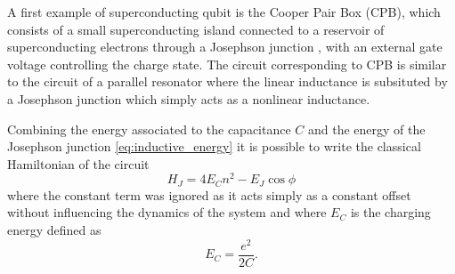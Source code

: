 A first example of superconducting qubit is the Cooper Pair Box (CPB), which consists of a small superconducting island connected to a reservoir of superconducting electrons through a Josephson junction \cite{Vion2002}, with an external gate voltage controlling the charge state.
The circuit corresponding to CPB is similar to the circuit of a parallel resonator where the linear inductance is subsituted by a Josephson junction which simply acts as a nonlinear inductance.

Combining the energy associated to the capacitance $C$ and the energy of the Josephson junction \ref{eq:inductive_energy} it is possible to write the classical Hamiltonian of the circuit
\begin{equation}\label{eq:CPB_hamiltonian}
    H_J = 4E_C n^2 - E_J\cos{\phi}
\end{equation}
where the constant term was ignored as it acts simply as a constant offset without influencing the dynamics of the system and where $E_C$ is the charging energy defined as \begin{equation}\label{eq:charging_energy}
    E_C = \frac{e^2}{2C}.
\end{equation}

